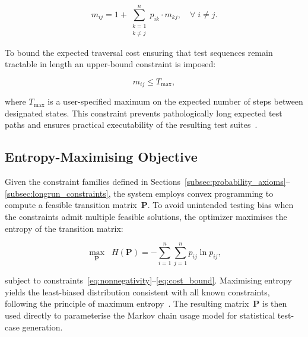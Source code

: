 \begin{equation}
\label{eq:first_passage}
m_{ij} = 1 + \sum_{\substack{k=1 \\ k \neq j}}^{n} p_{ik} \cdot m_{kj}, \quad \forall\; i \neq j.
\end{equation}

To bound the expected traversal cost ensuring that test sequences remain tractable in length an upper-bound constraint is imposed:

\begin{equation}
\label{eq:cost_bound}
m_{ij} \leq T_{\max},
\end{equation}

\noindent where $T_{\max}$ is a user-specified maximum on the expected number of steps between designated states. This constraint prevents pathologically long expected test paths and ensures practical executability of the resulting test suites~\cite{nap_statistics}.

\subsection{Entropy-Maximising Objective}%
\label{subsec:objective}

Given the constraint families defined in Sections~\ref{subsec:probability_axioms}--\ref{subsec:longrun_constraints}, the system employs convex programming to compute a feasible transition matrix~$\mathbf{P}$. To avoid unintended testing bias when the constraints admit multiple feasible solutions, the optimizer maximises the entropy of the transition matrix:

\begin{equation}
\label{eq:entropy_objective}
\max_{\mathbf{P}} \;\; H(\mathbf{P}) = -\sum_{i=1}^{n} \sum_{j=1}^{n} p_{ij} \ln p_{ij},
\end{equation}

\noindent subject to constraints~\eqref{eq:nonnegativity}--\eqref{eq:cost_bound}. Maximising entropy yields the least-biased distribution consistent with all known constraints, following the principle of maximum entropy~\cite{emml_usage_models}. The resulting matrix~$\mathbf{P}$ is then used directly to parameterise the Markov chain usage model for statistical test-case generation.
